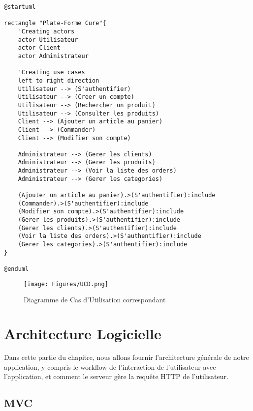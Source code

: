\lstset{
  basicstyle=\footnotesize, frame=tb,
  xleftmargin=.2\textwidth, xrightmargin=.2\textwidth,
    caption= Code Décrivant le Diagramme de Cas d'Utilisation
}
\begin{center}
\begin{lstlisting}
@startuml

rectangle "Plate-Forme Cure"{
    'Creating actors
    actor Utilisateur
    actor Client
    actor Administrateur

    'Creating use cases
    left to right direction
    Utilisateur --> (S'authentifier)
    Utilisateur --> (Creer un compte)
    Utilisateur --> (Rechercher un produit)
    Utilisateur --> (Consulter les produits)
    Client --> (Ajouter un article au panier)
    Client --> (Commander)
    Client --> (Modifier son compte) 
    
    Administrateur --> (Gerer les clients)
    Administrateur --> (Gerer les produits)
    Administrateur --> (Voir la liste des orders)
    Administrateur --> (Gerer les categories)

    (Ajouter un article au panier).>(S'authentifier):include
    (Commander).>(S'authentifier):include
    (Modifier son compte).>(S'authentifier):include
    (Gerer les produits).>(S'authentifier):include
    (Gerer les clients).>(S'authentifier):include
    (Voir la liste des orders).>(S'authentifier):include
    (Gerer les categories).>(S'authentifier):include
}

@enduml
\end{lstlisting}
\end{center}

\begin{figure}
    \centering
    \texttt{[image: Figures/UCD.png]}
    \caption{Diagramme de Cas d'Utilisation correspondant}
\end{figure}

\vspace{1cm}
\section{Architecture Logicielle}
\vspace{.5cm}

Dans cette partie du chapitre, nous allons fournir l’architecture générale de notre application, y compris le workflow de l’interaction de l’utilisateur avec l’application, et comment le serveur gère la requête HTTP de l’utilisateur. 

\vspace{.5cm}
\subsection{MVC}
\vspace{.5cm}

